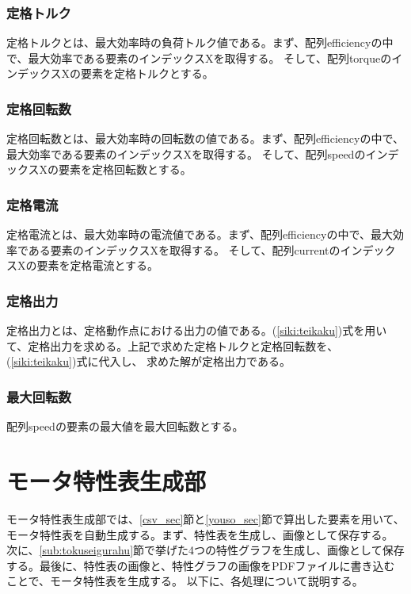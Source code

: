 \subsubsection{定格トルク}\label{sub:sub:teikakutoruku}
定格トルクとは、最大効率時の負荷トルク値である。まず、配列efficiencyの中で、最大効率である要素のインデックスXを取得する。
そして、配列torqueのインデックスXの要素を定格トルクとする。

\subsubsection{定格回転数}\label{sub:sub:teikakukaiten}
定格回転数とは、最大効率時の回転数の値である。まず、配列efficiencyの中で、最大効率である要素のインデックスXを取得する。
そして、配列speedのインデックスXの要素を定格回転数とする。

\subsubsection{定格電流}\label{sub:sub:teikakuden}
定格電流とは、最大効率時の電流値である。まず、配列efficiencyの中で、最大効率である要素のインデックスXを取得する。
そして、配列currentのインデックスXの要素を定格電流とする。

\subsubsection{定格出力}\label{sub:sub:teikakusyutu}
定格出力とは、定格動作点における出力の値である。(\ref{siki:teikaku})式を用いて、定格出力を求める。上記で求めた定格トルクと定格回転数を、(\ref{siki:teikaku})式に代入し、
求めた解が定格出力である。

\subsubsection{最大回転数}\label{sub:sub:saidaikai}
配列speedの要素の最大値を最大回転数とする。

\section{モータ特性表生成部}\label{mortoku_sec}
モータ特性表生成部では、\ref{csv_sec}節と\ref{youso_sec}節で算出した要素を用いて、モータ特性表を自動生成する。まず、特性表を生成し、画像として保存する。
次に、\ref{sub:tokuseigurahu}節で挙げた4つの特性グラフを生成し、画像として保存する。最後に、特性表の画像と、特性グラフの画像をPDFファイルに書き込むことで、モータ特性表を生成する。
以下に、各処理について説明する。

